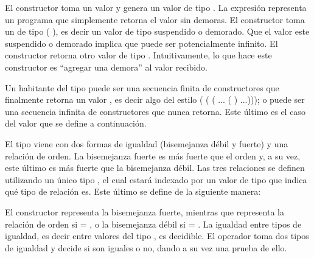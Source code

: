 El constructor  toma un valor  \AgdaSymbol{:}  y genera un valor de tipo  \AgdaDatatype{$\bot$}. La expresión   representa un programa que simplemente retorna el valor  sin demoras. 
El constructor  toma un  de tipo \AgdaFunction{$\infty$} ( \AgdaDatatype{$\bot$}), es decir un valor de tipo  \AgdaDatatype{$\bot$} suspendido o demorado. Que el valor este suspendido o demorado implica que puede ser potencialmente infinito. El constructor  retorna otro valor de tipo  \AgdaDatatype{$\bot$}. Intuitivamente, lo que hace este constructor es ``agregar una demora'' al valor recibido. 

Un habitante del tipo  \AgdaDatatype{$\bot$} puede ser una secuencia finita de constructores  que finalmente retorna un valor  \AgdaSymbol{:} , es decir algo del estilo  (\AgdaFunction{$\sharp$} ( (\AgdaFunction{$\sharp$} ... ( ) ...))); o puede ser una secuencia infinita de constructores  que nunca retorna. Este último es el caso del valor  que se define a continuación. 


El tipo \AgdaDatatype{\_$\bot$} viene con dos formas de igualdad (bisemejanza débil y fuerte) y una relación de orden. La bisemejanza fuerte es más fuerte que el orden y, a su vez, este último es más fuerte que la bisemejanza débil. Las tres relaciones se definen utilizando un único tipo , el cual estará indexado por un valor de tipo  que indica qué tipo de relación es. Este último se define de la siguiente manera:


El constructor  representa la bisemejanza fuerte, mientras que   representa la relación de orden si  = , o la bisemejanza débil si  = . La igualdad entre tipos de igualdad, es decir entre valores del tipo , es decidible. El operador  toma dos tipos de igualdad y decide si son iguales o no, dando a su vez una prueba de ello. 

